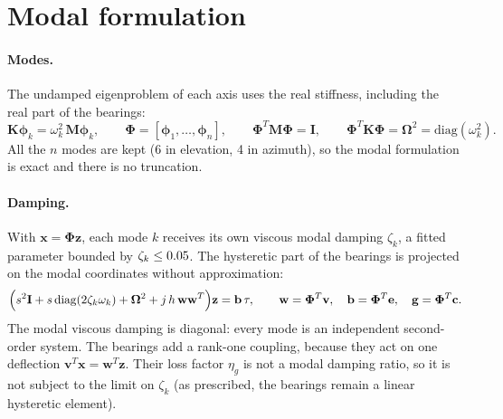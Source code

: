 \documentclass[10pt,a4paper]{article}
\numberwithin{equation}{section}
\begin{document}
\section{Modal formulation}\label{sec:modal}
\paragraph{Modes.} The undamped eigenproblem of each axis uses the real stiffness, including the real part of the bearings:
\begin{equation}
\mathbf K\bm\phi_k=\omega_k^2\,\mathbf M\bm\phi_k,\qquad \bm\Phi=[\bm\phi_1,\dots,\bm\phi_n],\qquad \bm\Phi^T\mathbf M\bm\Phi=\mathbf I,\qquad \bm\Phi^T\mathbf K\bm\Phi=\bm\Omega^2=\mathrm{diag}(\omega_k^2) .
\end{equation}
All the $n$ modes are kept (6 in elevation, 4 in azimuth), so the modal formulation is exact and there is no truncation.

\paragraph{Damping.} With $\mathbf x=\bm\Phi\mathbf z$, each mode $k$ receives its own viscous modal damping $\zeta_k$, a fitted parameter bounded by $\zeta_k\leq0.05$. The hysteretic part of the bearings is projected on the modal coordinates without approximation:
\begin{equation}
\Bigl(s^2\mathbf I+s\,\mathrm{diag}(2\zeta_k\omega_k)+\bm\Omega^2+j\,h\,\mathbf w\mathbf w^T\Bigr)\mathbf z=\mathbf b\,\tau,\qquad
\mathbf w=\bm\Phi^T\mathbf v,\quad \mathbf b=\bm\Phi^T\mathbf e,\quad \mathbf g=\bm\Phi^T\mathbf c .\label{eq:modaleq}
\end{equation}
The modal viscous damping is diagonal: every mode is an independent second-order system. The bearings add a rank-one coupling, because they act on one deflection $\mathbf v^T\mathbf x=\mathbf w^T\mathbf z$. Their loss factor $\eta_g$ is not a modal damping ratio, so it is not subject to the limit on $\zeta_k$ (as prescribed, the bearings remain a linear hysteretic element).
\end{document}
